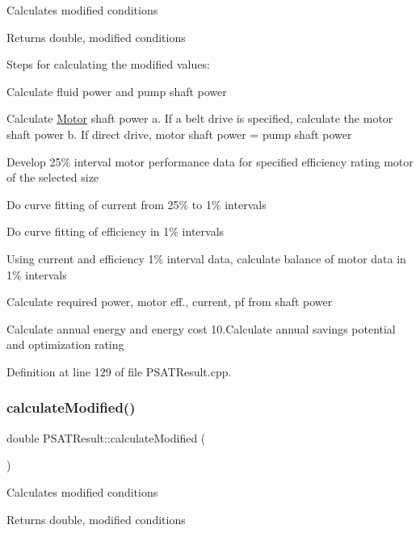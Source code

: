 Calculates modified conditions \begin{DoxyReturn}{Returns}
double, modified conditions 
\end{DoxyReturn}
Steps for calculating the modified values\+:
\begin{DoxyEnumerate}
\item Calculate fluid power and pump shaft power
\item Calculate \hyperlink{class_motor}{Motor} shaft power a. If a belt drive is specified, calculate the motor shaft power b. If direct drive, motor shaft power = pump shaft power
\item Develop 25\% interval motor performance data for specified efficiency rating motor of the selected size
\item Do curve fitting of current from 25\% to 1\% intervals
\item Do curve fitting of efficiency in 1\% intervals
\item Using current and efficiency 1\% interval data, calculate balance of motor data in 1\% intervals
\item Calculate required power, motor eff., current, pf from shaft power
\item Calculate annual energy and energy cost 10.\+Calculate annual savings potential and optimization rating
\end{DoxyEnumerate}

Definition at line 129 of file P\+S\+A\+T\+Result.\+cpp.

\mbox{\label{class_p_s_a_t_result_afbb68257a28c1b853d26faf3227461cc}} 
\subsubsection{\texorpdfstring{calculate\+Modified()}{calculateModified()}\hspace{0.1cm}{\footnotesize\ttfamily [3/3]}}
{\footnotesize\ttfamily double P\+S\+A\+T\+Result\+::calculate\+Modified (\begin{DoxyParamCaption}{ }\end{DoxyParamCaption})}

Calculates modified conditions \begin{DoxyReturn}{Returns}
double, modified conditions 
\end{DoxyReturn}
\mbox{\label{class_p_s_a_t_result_a25d50cd89b326f18449496a56d54f472}} 
